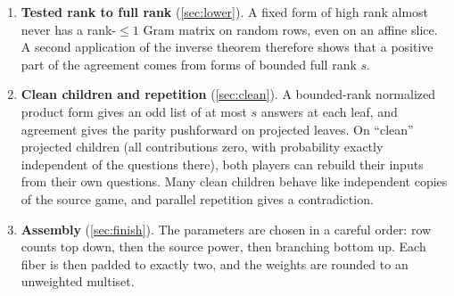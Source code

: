 \documentclass[11pt]{article}
\theoremstyle{definition}
\theoremstyle{remark}
\begin{document}
\begin{enumerate}[leftmargin=*]
$\gamma_j>0$, independent of the lower row count.
\item \textbf{Tested rank to full rank} (\cref{sec:lower}). A fixed form of
high rank almost never has a rank-$\le1$ Gram matrix on random rows, even on
an affine slice. A second application of the inverse theorem therefore shows
that a positive part of the agreement comes from forms of bounded full rank
$s$.
\item \textbf{Clean children and repetition} (\cref{sec:clean}). A bounded-rank
normalized product form gives an odd list of at most $s$ answers at each leaf,
and agreement gives the parity pushforward on projected leaves. On
``clean'' projected children (all contributions zero, with probability exactly
independent of the questions there), both players can rebuild their inputs
from their own questions. Many clean children behave like independent copies
of the source game, and parallel repetition gives a contradiction.
\item \textbf{Assembly} (\cref{sec:finish}). The parameters are chosen in a
careful order: row counts top down, then the source power, then branching
bottom up. Each fiber is then padded to exactly two, and the weights are
rounded to an unweighted multiset.
\end{enumerate}
\end{document}

